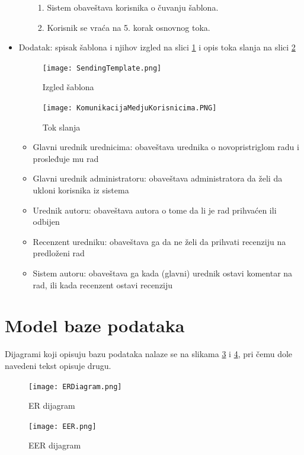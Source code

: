 \documentclass[a4paper]{article}
\begin{document}
\begin{itemize}
\begin{enumerate}
\begin{enumerate}
                \item Sistem obaveštava korisnika o čuvanju šablona.
                \item Korisnik se vraća na 5. korak osnovnog toka.
            \end{enumerate}
        \end{enumerate}
    \item Dodatak: spisak šablona i njihov izgled na slici \ref{fig:template} i opis toka slanja na slici \ref{fig:tok}
    \begin{figure}[h!]
    \centering
    \texttt{[image: SendingTemplate.png]}
    \caption{Izgled šablona}
    \label{fig:template}
    \end{figure}
    \begin{figure}[h!]
    \centering
    \texttt{[image: KomunikacijaMedjuKorisnicima.PNG]}
    \caption{Tok slanja \cite{alex} \cite{vparadigm}}
    \label{fig:tok}
    \end{figure}
    \begin{itemize}
        \item Glavni urednik urednicima: obaveštava urednika o novopristriglom radu i prosleđuje mu rad
        \item Glavni urednik administratoru: obaveštava administratora da želi da ukloni korisnika iz sistema
        \item Urednik autoru: obaveštava autora o tome da li je rad prihvaćen ili odbijen 
        \item Recenzent uredniku: obaveštava ga da ne želi da prihvati recenziju na predloženi rad
        \item Sistem autoru: obaveštava ga kada (glavni) urednik ostavi komentar na rad, ili kada recenzent ostavi recenziju
    \end{itemize}
\end{itemize}

\newpage

\section{Model baze podataka}
\label{section:modelbaze}

Dijagrami koji opisuju bazu podataka nalaze se na slikama \ref{fig:er} i \ref{fig:eer}, pri čemu dole navedeni tekst opisuje drugu.
\begin{figure}[hbt!]
    \centering
    \texttt{[image: ERDiagram.png]}
    \caption{ER dijagram \cite{erdplus}}
    \label{fig:er}
\end{figure}
\afterpage{\clearpage}
\begin{figure}
    \centering
    \texttt{[image: EER.png]}
    \caption{EER dijagram \cite{wbench}}
    \label{fig:eer}
\end{figure}
\end{document}
